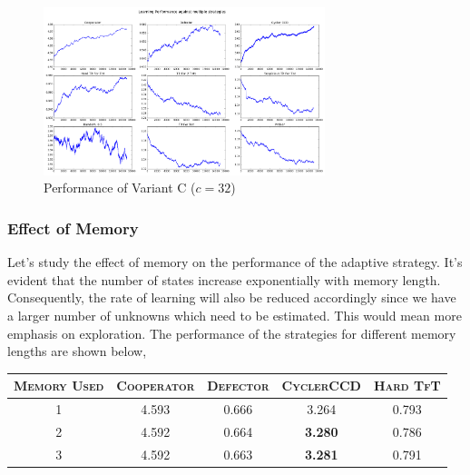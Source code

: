 \documentclass[a4paper]{article}
\begin{document}
	\begin{figure}[H]
	\centering
	\includegraphics[width=0.73\textwidth]{learnerInitialC_b32.png}
	\caption*{{Performance of Variant C ($c = 32$)}}
	\end{figure}

	\subsubsection{Effect of Memory}
	
	Let's study the effect of memory on the performance of the adaptive strategy. It's evident that the number of states increase exponentially with memory length. Consequently, the rate of learning will also be reduced accordingly since we have a larger number of unknowns which need to be estimated. This would mean more emphasis on exploration. The performance of the strategies for different memory lengths are shown below,\\
	
	\vspace{-5mm}	
	\begin{table}[H]
	  \begin{center}
	    \begin{tabular}{|c|c|c|c|c|}
	      \toprule
		  \textsc{Memory Used} & \textsc{Cooperator} & \textsc{Defector} & {\footnotesize{\textsc{CyclerCCD}}} & \textsc{Hard TfT}\\
	      \midrule
		   1 & 	4.593 & 0.666 & 3.264 & 0.793\\
		   2 & 4.592 & 0.664 & \textbf{3.280} & 0.786\\
		   3 & 4.592 & 0.663 & \textbf{3.281} & 0.791\\
		   \bottomrule
	    \end{tabular}
	  \end{center}
	\end{table} 

	\vspace{-8mm}	
	
\end{document}
